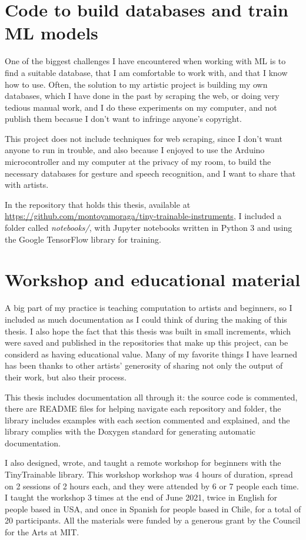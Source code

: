 \section{Code to build databases and train ML models}

One of the biggest challenges I have encountered when working with \acrshort{ML} is to find a suitable database, that I am comfortable to work with, and that I know how to use. Often, the solution to my artistic project is building my own databases, which I have done in the past by scraping the web, or doing very tedious manual work, and I do these experiments on my computer, and not publish them becasue I don't want to infringe anyone's copyright.

This project does not include techniques for web scraping, since I don't want anyone to run in trouble, and also because I enjoyed to use the Arduino microcontroller and my computer at the privacy of my room, to build the necessary databases for gesture and speech recognition, and I want to share that with artists.

In the repository that holds this thesis, available at \url{https://github.com/montoyamoraga/tiny-trainable-instruments}, I included a folder called \emph{notebooks/}, with Jupyter notebooks written in Python 3 and using the Google TensorFlow library for training.

\section{Workshop and educational material}

A big part of my practice is teaching computation to artists and beginners, so I included as much documentation as I could think of during the making of this thesis. I also hope the fact that this thesis was built in small increments, which were saved and published in the repositories that make up this project, can be considerd as having  educational value. Many of my favorite things I have learned has been thanks to other artists' generosity of sharing not only the output of their work, but also their process.

This thesis includes documentation all through it: the source code is commented, there are README files for helping navigate each repository and folder, the library includes examples with each section commented and explained, and the library complies with the Doxygen standard for generating automatic documentation.

I also designed, wrote, and taught a remote workshop for beginners with the TinyTrainable library. This workshop workshop was 4 hours of duration, spread on 2 sessions of 2 hours each, and they were attended by 6 or 7 people each time. I taught the workshop 3 times at the end of June 2021, twice in English for people based in USA, and once in Spanish for people based in Chile, for a total of 20 participants. All the materials were funded by a generous grant by the Council for the Arts at MIT.

